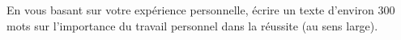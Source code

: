 
\begin{exercice}\label{exosmath-0419}

    En vous basant sur votre expérience personnelle, écrire un texte d'environ $300$ mots sur l'importance du travail personnel dans la réussite (au sens large).

\end{exercice}
